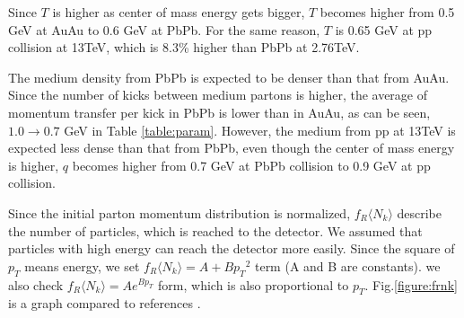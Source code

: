 \documentclass[jkps,fleqn,showpacs,showkeys]{revtex4-2}
\begin{document}
Since $T$ is higher as center of mass energy gets bigger, $T$ becomes higher from 0.5 GeV at AuAu to 0.6 GeV at PbPb. 
For the same reason, $T$ is 0.65 GeV at pp collision at 13TeV, which is 8.3\% higher than PbPb at 2.76TeV.

The medium density from PbPb is expected to be denser than that from AuAu.
Since the number of kicks between medium partons is higher, the average of momentum transfer per kick in PbPb is lower than in AuAu,
as can be seen, $1.0 \rightarrow 0.7$ GeV in Table \ref{table:param}.
However, the medium from pp at 13TeV is expected less dense than that from PbPb, even though the center of mass energy is higher,
$q$ becomes higher from 0.7 GeV at PbPb collision to 0.9 GeV at pp collision. 




Since the initial parton momentum distribution is normalized, $f_R \langle N_k \rangle$ describe the number of particles,
which is reached to the detector.
We assumed that particles with high energy can reach the detector more easily.
Since the square of $p_T$ means energy, we set $f_R \langle N_k \rangle = A+B{p_T}^2$ term (A and B are constants).
we also check $f_R \langle N_k \rangle = Ae^{Bp_T}$ form, which is also proportional to $p_T$.
Fig.\ref{figure:frnk} is a graph compared to references \cite{Wong_1, PbPb}.
\end{document}
